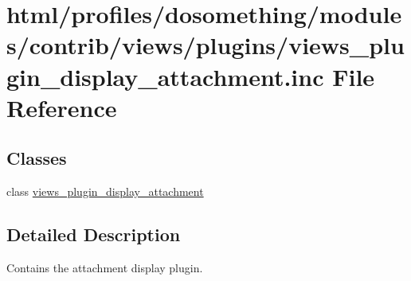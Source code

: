 \hypertarget{views__plugin__display__attachment_8inc}{
\section{html/profiles/dosomething/modules/contrib/views/plugins/views\_\-plugin\_\-display\_\-attachment.inc File Reference}
\label{views__plugin__display__attachment_8inc}
}
\subsection*{Classes}
\begin{DoxyCompactItemize}
\item 
class \hyperlink{classviews__plugin__display__attachment}{views\_\-plugin\_\-display\_\-attachment}
\end{DoxyCompactItemize}


\subsection{Detailed Description}
Contains the attachment display plugin. 